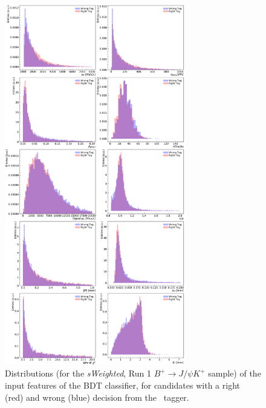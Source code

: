 \begin{figure}[htbp]
        \begin{center}
        \includegraphics[width=0.7\textwidth]{04Flavourtagging/figs/OSelectronOpt/2017-12-12-vibattis-OSElectron-bdt-calibration-sWeights_Run1/FeaturesDistribution_RunIcuts.pdf}
        \end{center}
        \vspace{-2mm}
        \caption{Distributions (for the \emph{sWeighted}, Run 1 $B^+\to J/\psi K^+$ sample) of the input features of the BDT classifier, for candidates with a right (red) and wrong (blue) decision from the \OSe~tagger.}
         \label{fig:OSefeaturesRunI}
\end{figure}

